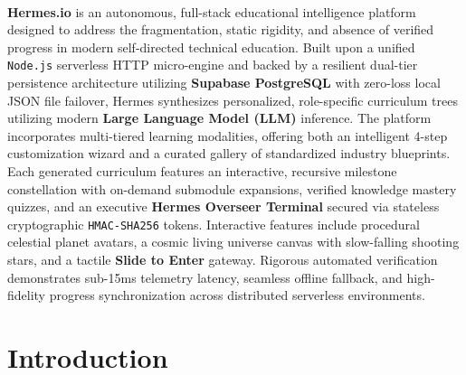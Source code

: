 \documentclass[12pt,a4paper]{article}
\begin{document}
\setcounter{page}{3}

\\
\vspace{2pt}
\begin{abstractbox}
\noindent
\textbf{Hermes.io} is an autonomous, full-stack educational intelligence platform designed to address the fragmentation, static rigidity, and absence of verified progress in modern self-directed technical education. Built upon a unified \texttt{Node.js} serverless HTTP micro-engine and backed by a resilient dual-tier persistence architecture utilizing \textbf{Supabase PostgreSQL} with zero-loss local JSON file failover, Hermes synthesizes personalized, role-specific curriculum trees utilizing modern \textbf{Large Language Model (LLM)} inference. The platform incorporates multi-tiered learning modalities, offering both an intelligent 4-step customization wizard and a curated gallery of standardized industry blueprints. Each generated curriculum features an interactive, recursive milestone constellation with on-demand submodule expansions, verified knowledge mastery quizzes, and an executive \textbf{Hermes Overseer Terminal} secured via stateless cryptographic \texttt{HMAC-SHA256} tokens. Interactive features include procedural celestial planet avatars, a cosmic living universe canvas with slow-falling shooting stars, and a tactile \textbf{Slide to Enter} gateway. Rigorous automated verification demonstrates sub-15ms telemetry latency, seamless offline fallback, and high-fidelity progress synchronization across distributed serverless environments.
\end{abstractbox}

\vspace{12pt}

{
\hypersetup{linkcolor=navyHead}
\tableofcontents
}

\newpage

\section{Introduction}
\end{document}
